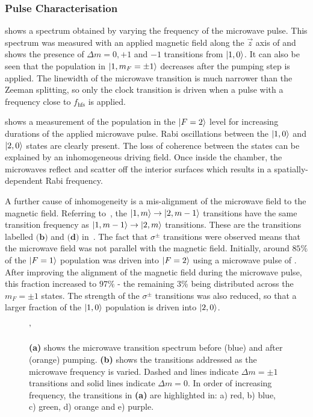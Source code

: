 \subsubsection{Pulse Characterisation}
 shows a spectrum obtained by
varying the frequency of the microwave pulse. This spectrum was
measured with an applied magnetic field along the $\vec{z}$ axis of
 and shows the presence
of \(\Delta m = 0, +1 \) and $-1$ transitions from \(\ket{1,0}\). It
can also be seen that the population in \(\ket{1,m_F=\pm 1}\) decreases after
the  pumping step is applied. The linewidth of the
microwave transition is much narrower than the Zeeman splitting, so
only the clock transition is driven when a pulse with a frequency
close to \(f_\text{hfs}\) is applied. 
\par\noindent
{} shows a measurement of the population in the
\(\ket{F=2}\) level for increasing durations of the applied
microwave pulse. Rabi oscillations between the \(\ket{1,0}\) and
\(\ket{2,0}\) states are clearly present. The loss of coherence
between the states can be explained by an inhomogeneous driving field.
Once inside the chamber, the microwaves reflect and scatter off the
interior surfaces which results in a spatially-dependent Rabi
frequency. \par\noindent
A further cause of inhomogeneity is a mis-alignment of the microwave
field to the magnetic field. Referring
to~, the
$\ket{1,m}\rightarrow\ket{2,m-1}$
transitions have the same transition frequency as
$\ket{1,m-1}\rightarrow\ket{2,m}$
transitions. These are the transitions labelled $\textbf{(b)}$ and
$\textbf{(d)}$ in~. 
The fact that $\sigma^{\pm}$ transitions were observed means
that the microwave field was not parallel with the magnetic field.
Initially, around 
\(85\%\) of the $\ket{F=1}$ population was driven into \(\ket{F=2}\) using a
microwave pulse of . After improving the
alignment of the magnetic field during the microwave pulse, this
fraction increased to \(97\%\) - the remaining 3\% being distributed
across the \(m_F = \pm 1\) states. The strength of the $\sigma^{\pm}$
transitions was also reduced, so that a larger fraction of the
$\ket{1,0}$ population is driven into $\ket{2,0}$. 
\begin{figure}[!htbp]
    \centering
    \def\svgwidth{\columnwidth}
    \fontsize{14pt}{14pt}
    \subfloat[][]{\scalebox{0.5}{}\label{fig:microwave_spectrum}}
    \subfloat[][]{\scalebox{0.5}{\raisebox{4ex}{}}\label{fig:mw_spectrum_trans}}
    \caption[Microwave transition spectrum]{\textbf{(a)} shows the
      microwave transition spectrum before (blue) and after (orange)
     pumping. \textbf{(b)} shows the transitions addressed
  as the microwave frequency is varied. Dashed and lines indicate
\(\Delta m = \pm 1\) transitions and solid lines indicate \(\Delta m =
0\). In order of increasing frequency, the transitions in \textbf{(a)} are highlighted in: a) red, b) blue, c) green, d) orange and e) purple.} 
    \label{fig:microwave_data}'
\end{figure}
